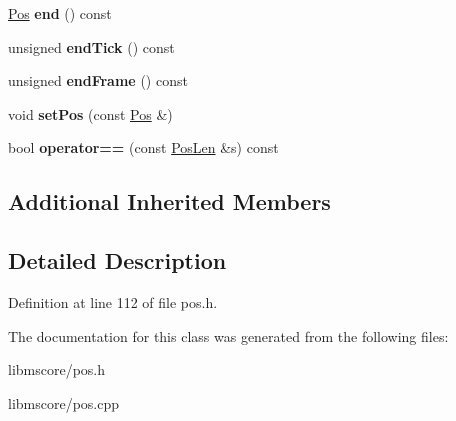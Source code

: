 \begin{DoxyCompactItemize}
\hyperlink{class_ms_1_1_pos}{Pos} {\bfseries end} () const
\item 
\mbox{\label{class_ms_1_1_pos_len_a7ef7b445ddf12d39b6a5a0d906056e81}} 
unsigned {\bfseries end\+Tick} () const
\item 
\mbox{\label{class_ms_1_1_pos_len_a63a7d06e51df15e801862a205a2fca2e}} 
unsigned {\bfseries end\+Frame} () const
\item 
\mbox{\label{class_ms_1_1_pos_len_a247a6205382845ffe967a006ea4bbefd}} 
void {\bfseries set\+Pos} (const \hyperlink{class_ms_1_1_pos}{Pos} \&)
\item 
\mbox{\label{class_ms_1_1_pos_len_abf9c3bf52d4c14feff61a1c054842130}} 
bool {\bfseries operator==} (const \hyperlink{class_ms_1_1_pos_len}{Pos\+Len} \&s) const
\end{DoxyCompactItemize}
\subsection*{Additional Inherited Members}


\subsection{Detailed Description}


Definition at line 112 of file pos.\+h.



The documentation for this class was generated from the following files\+:\begin{DoxyCompactItemize}
\item 
libmscore/pos.\+h\item 
libmscore/pos.\+cpp\end{DoxyCompactItemize}
